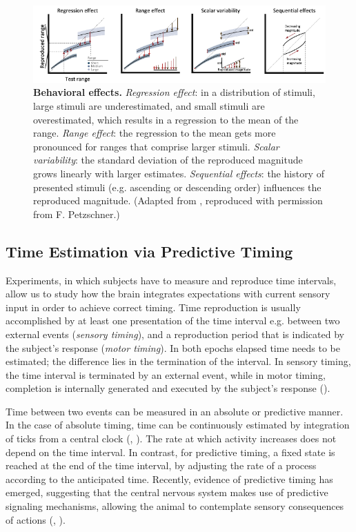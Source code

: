\documentclass[10pt, a4paper]{article}
\begin{document}
\begin{figure}[ht]
	\centering
	\includegraphics[width=\textwidth]{figures/behavioural_effects_petzschner.pdf}
	\caption{\textbf{Behavioral effects.} 
	\textit{Regression effect}: in a distribution of stimuli, large stimuli are underestimated, and small stimuli are overestimated, which results in a regression to the mean of the range.
	\textit{Range effect}: the regression to the mean gets more pronounced for ranges that comprise larger stimuli. 
	\textit{Scalar variability}: the standard deviation of the reproduced magnitude grows linearly with larger estimates. 
	\textit{Sequential effects}: the history of presented stimuli (e.g. ascending or descending order) influences the reproduced magnitude. 
	(Adapted from \cite{Petzschner2015}, reproduced with permission from F. Petzschner.)}
	\label{fig:behavioraleffects}
\end{figure}

\subsection{Time Estimation via Predictive Timing}
Experiments, in which subjects have to measure and reproduce time intervals, allow us to study how the brain integrates expectations with current sensory input in order to achieve correct timing.
Time reproduction is usually accomplished by at least one presentation of the time interval e.g. between two external events (\textit{sensory timing}), and a reproduction period that is indicated by the subject's response (\textit{motor timing}).
In both epochs elapsed time needs to be estimated; the difference lies in the termination of the interval. In sensory timing, the time interval is terminated by an external event, while in motor timing, completion is internally generated and executed by the subject's response (\cite{Grondin2010}).

Time between two events can be measured in an absolute or predictive manner. 
In the case of absolute timing, time can be continuously estimated by integration of ticks from a central clock (\cite{Buhusi2005}, \cite{Paton2018}).
The rate at which activity increases does not depend on the time interval.
In contrast, for predictive timing, a fixed state is reached at the end of the time interval, by adjusting the rate of a process according to the anticipated time.
Recently, evidence of predictive timing has emerged, suggesting that the central nervous system makes use of predictive signaling mechanisms, allowing the animal to contemplate sensory consequences of actions (\cite{Egger2019}, \cite{Meirhaeghe2021}).
\end{document}
